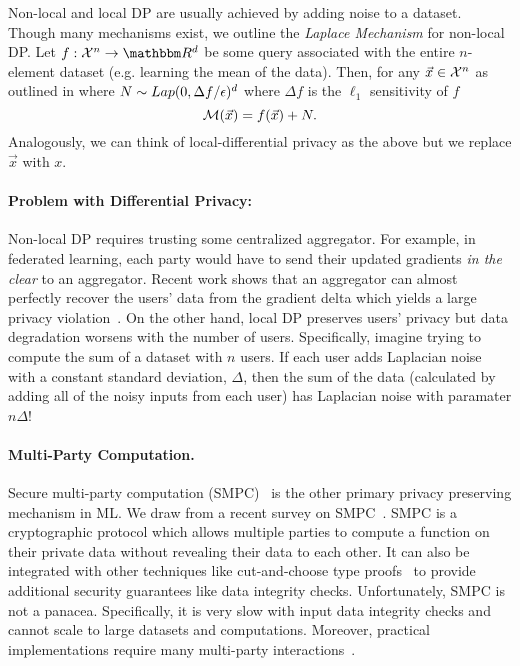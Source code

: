 \documentclass[11pt]{article}
\begin{document}
Non-local and local DP are usually achieved by adding noise to a dataset.
Though many mechanisms exist, we outline the \emph{Laplace Mechanism} for non-local DP.
Let $f: \mathcal{X}^n \rightarrow \R^d$ be some query associated with the entire $n$-element dataset (e.g. learning the mean of the data).
Then, for any $\vec{x} \in \mathcal{X}^n$ as outlined in \cite{Bassily_2015} where $N \sim Lap(0, \Delta f/ \epsilon)^{d}$ where $\Delta f$ is the $\ell_1$ sensitivity of $f$
\[
	\mathcal{M}(\vec{x}) = f(\vec{x}) + N.
\]
Analogously, we can think of local-differential privacy as the above but we replace $\vec{x}$ with $x$.

\paragraph{Problem with Differential Privacy:} Non-local DP requires trusting some centralized aggregator.
For example, in federated learning, each party would have to send their updated gradients \emph{in the clear} to an aggregator.
Recent work shows that an aggregator can almost perfectly recover the users' data from the gradient delta which yields a large privacy violation~\cite{gupta2022recoveringprivatetextfederated}.
On the other hand, local DP preserves users' privacy but data degradation worsens with the number of users.
Specifically, imagine trying to compute the sum of a dataset with $n$ users.
If each user adds Laplacian noise with a constant standard deviation, $\Delta$, then the sum of the data (calculated by adding all of the noisy inputs from each user) has Laplacian noise with paramater $n \Delta$!

\paragraph{Multi-Party Computation.}
Secure multi-party computation (SMPC)~\cite{yao1986generate} is the other primary privacy preserving mechanism in ML.
We draw from a recent survey on SMPC~\cite{zhou2024secure}.
SMPC is a cryptographic protocol which allows multiple parties to compute a function on their private data without revealing their data to each other.
It can also be integrated with other techniques like cut-and-choose type proofs~\cite{lindell2016fast} to provide additional security guarantees like data integrity checks.
Unfortunately, SMPC is not a panacea.
Specifically, it is very slow with input data integrity checks and cannot scale to large datasets and computations.
Moreover, practical implementations require many multi-party interactions~\cite{zhao2019secure}.
\end{document}
